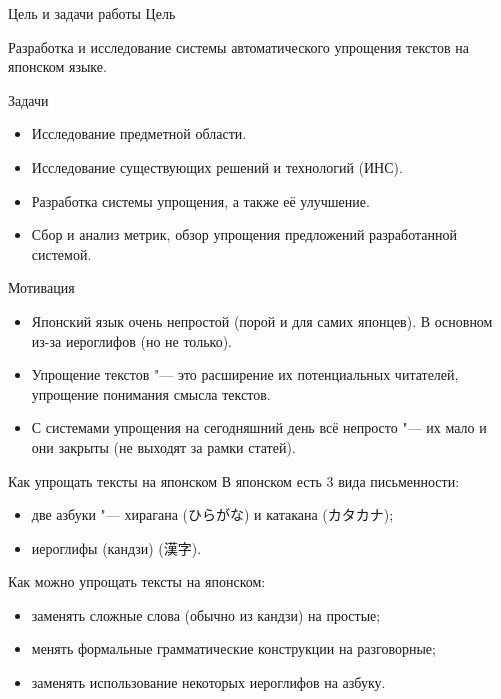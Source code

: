 \begin{frame}[fragile]{Цель и задачи работы}%
  \Large
  Цель
  \normalsize

  Разработка и исследование системы автоматического упрощения текстов на японском языке.

  \Large
  Задачи
  \normalsize

  \begin{itemize}%
    \item Исследование предметной области.
    \item Исследование существующих решений и технологий (ИНС).
    \item Разработка системы упрощения, а также её улучшение.
    \item Сбор и анализ метрик, обзор упрощения предложений разработанной системой.
  \end{itemize}
\end{frame}


\begin{frame}[fragile]{Мотивация}%
  \begin{itemize}%
    \item Японский язык очень непростой (порой и для самих японцев). В основном из-за иероглифов (но не только).
    \item Упрощение текстов "--- это расширение их потенциальных читателей, упрощение понимания смысла текстов.
    \item С системами упрощения на сегодняшний день всё непросто "--- их мало и они закрыты (не выходят за рамки статей).
  \end{itemize}
\end{frame}


\begin{frame}[fragile]{Как упрощать тексты на японском}%
  В японском есть 3 вида письменности:
  \begin{itemize}%
    \item две азбуки "--- хирагана (ひらがな) и катакана (カタカナ);
    \item иероглифы (кандзи) (漢字).
  \end{itemize}

  Как можно упрощать тексты на японском:
  \begin{itemize}%
    \item заменять сложные слова (обычно из кандзи) на простые;
    \item менять формальные грамматические конструкции на разговорные;
    \item заменять использование некоторых иероглифов на азбуку.
  \end{itemize}
\end{frame}
